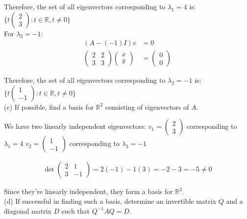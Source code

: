 \documentclass{article}
\begin{document}
Therefore, the set of all eigenvectors corresponding to $\lambda_1 = 4$ is:
$\{t\begin{pmatrix} 2 \\ 3 \end{pmatrix} : t \in \mathbb{R}, t \neq 0\}$ \\

For $\lambda_2 = -1$:
\begin{align*}
(A - (-1)I)v &= 0\\
\begin{pmatrix} 2 & 2 \\ 3 & 3 \end{pmatrix}\begin{pmatrix} x \\ y \end{pmatrix} &= \begin{pmatrix} 0 \\ 0 \end{pmatrix}
\end{align*}

Therefore, the set of all eigenvectors corresponding to $\lambda_2 = -1$ is:
$\{t\begin{pmatrix} 1 \\ -1 \end{pmatrix} : t \in \mathbb{R}, t \neq 0\}$ \\

(c) If possible, find a basis for $\mathbb{R}^2$ consisting of eigenvectors of $A$.

We have two linearly independent eigenvectors:
$v_1 = \begin{pmatrix} 2 \\ 3 \end{pmatrix}$ corresponding to $\lambda_1 = 4$
$v_2 = \begin{pmatrix} 1 \\ -1 \end{pmatrix}$ corresponding to $\lambda_2 = -1$

\begin{align*}
\det\begin{pmatrix} 2 & 1 \\ 3 & -1 \end{pmatrix} = 2(-1) - 1(3) = -2 - 3 = -5 \neq 0
\end{align*}

Since they're linearly independent, they form a basis for $\mathbb{R}^2$. \\

(d) If successful in finding such a basis, determine an invertible matrix $Q$ and a diagonal matrix $D$ such that $Q^{-1}AQ = D$.
\end{document}
